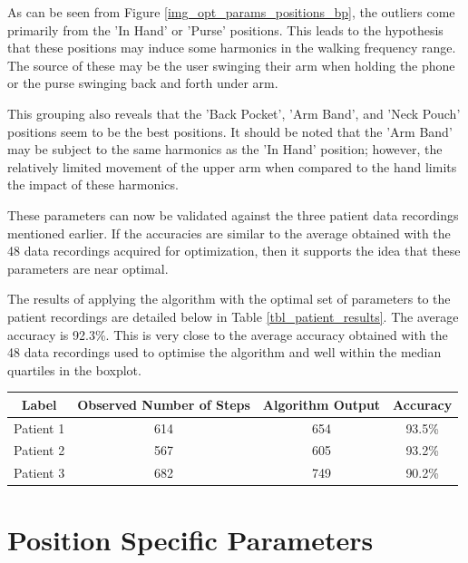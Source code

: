             As can be seen from Figure \ref{img_opt_params_positions_bp}, the outliers come primarily from the 'In Hand' or 'Purse' positions. This leads to the hypothesis that these positions may induce some harmonics in the walking frequency range. The source of these may be the user swinging their arm when holding the phone or the purse swinging back and forth under arm.

            This grouping also reveals that the 'Back Pocket', 'Arm Band', and 'Neck Pouch' positions seem to be the best positions. It should be noted that the 'Arm Band' may be subject to the same harmonics as the 'In Hand' position; however, the relatively limited movement of the upper arm when compared to the hand limits the impact of these harmonics.

            These parameters can now be validated against the three patient data recordings mentioned earlier. If the accuracies are similar to the average obtained with the 48 data recordings acquired for optimization, then it supports the idea that these parameters are near optimal.

            The results of applying the algorithm with the optimal set of parameters to the patient recordings are detailed below in Table \ref{tbl_patient_results}. The average accuracy is 92.3\%. This is very close to the average accuracy obtained with the 48 data recordings used to optimise the algorithm and well within the median quartiles in the boxplot.

            \begin{center}
                \label{tbl_patient_results}
                \begin{tabular}{|c|c|c|c|}
                    \hline
                    Label & Observed Number of Steps & Algorithm Output & Accuracy \\
                    \hline
                    Patient 1 & 614 & 654 & 93.5\% \\ 
                    Patient 2 & 567 & 605 & 93.2\% \\
                    Patient 3 & 682 & 749 & 90.2\% \\
                    \hline
                \end{tabular}
            \end{center}

        \section{Position Specific Parameters}

